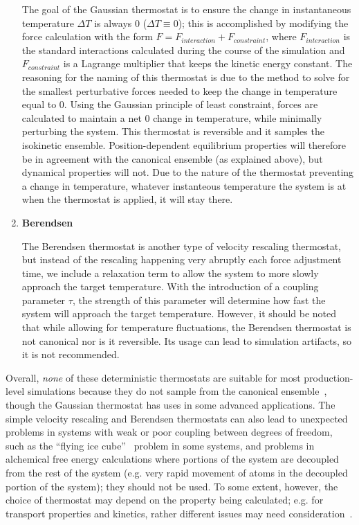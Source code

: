\documentclass[9pt,bestpractices]{livecoms}
\begin{document}
\begin{enumerate}[listparindent=\parindent]
        The goal of the Gaussian thermostat is to ensure the change in instantaneous temperature $\Delta T$ is always 0 ($\Delta T \equiv 0$); this is accomplished by modifying the force calculation with the form $F = F_{interaction} + F_{constraint}$, where $F_{interaction}$ is the standard interactions calculated during the course of the simulation and $F_{constraint}$ is a Lagrange multiplier that keeps the kinetic energy constant.
        The reasoning for the naming of this thermostat is due to the method to solve for the smallest perturbative forces needed to keep the change in temperature equal to 0.
        Using the Gaussian principle of least constraint, forces are calculated to maintain a net 0 change in temperature, while minimally perturbing the system\cite{thermostatAlgorithms2005}.
        This thermostat is reversible and it samples the isokinetic ensemble.
        Position-dependent equilibrium properties will therefore be in agreement with the canonical ensemble (as explained above), but dynamical properties will not.
        Due to the nature of the thermostat preventing a change in temperature, whatever instanteous temperature the system is at when the thermostat is applied, it will stay there. 

    \item \textbf{Berendsen}

        The Berendsen thermostat is another type of velocity rescaling thermostat, but instead of the rescaling happening very abruptly each force adjustment time, we include a relaxation term to allow the system to more slowly approach the target temperature\cite{berendsen1984molecular}.
        With the introduction of a coupling parameter $\tau$, the strength of this parameter will determine how fast the system will approach the target temperature.
        However, it should be noted that while allowing for temperature fluctuations, the Berendsen thermostat is not canonical nor is it reversible.
        Its usage can lead to simulation artifacts, so it is not recommended\cite{Braun:2018:arXiv}.

\end{enumerate}

Overall, \emph{none} of these deterministic thermostats are suitable for most production-level simulations because they do not sample from the canonical ensemble~\cite{Shirts:2013:J.Chem.TheoryComput.}, though the Gaussian thermostat has uses in some advanced applications\cite{Minary:2002:JChemPhysAlgorithms}.
The simple velocity rescaling and Berendsen thermostats can also lead to unexpected problems in systems with weak or poor coupling between degrees of freedom, such as the ``flying ice cube''~\cite{Harvey:1998:JCompChem} problem in some systems, and problems in alchemical free energy calculations where portions of the system are decoupled from the rest of the system (e.g. very rapid movement of atoms in the decoupled portion of the system); they should not be used.
To some extent, however, the choice of thermostat may depend on the property being calculated; e.g. for transport properties and kinetics, rather different issues may need consideration~\cite{Basconi:2013:J.Chem.TheoryComput.}.
\end{document}
